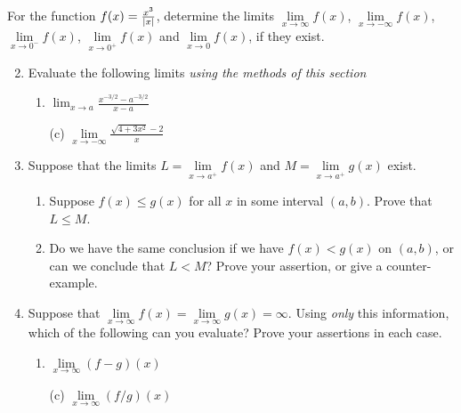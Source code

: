 \begin{exercises}
\exstart For the function $f(x)=\frac{x^3}{\left| x\right|}$, determine the limits $\lim\limits_{x\to\infty}f(x)$, $\lim\limits_{x\to-\infty}f(x)$, $\lim\limits_{x\to 0^-}f(x)$, $\lim\limits_{x\to 0^+}f(x)$ and $\lim\limits_{x\to 0}f(x)$, if they exist.
\begin{enumerate}\setcounter{enumi}{1}\itemsep0pt 
  \item Evaluate the following limits \emph{using the methods of this section}
  \begin{enumerate}
    \item {}
    \space$\displaystyle\lim_{x\to a}\frac{x^{-3/2}-a^{-3/2}}{x-a}$
    \item[(c)] 
    \space $\displaystyle\lim\limits_{x\to -\infty}\frac{\sqrt{4+3x^2}-2}{x}$
  \end{enumerate}
  
  
  \item Suppose that the limits $L=\lim\limits_{x\to a^+}f(x)$ and $M=\lim\limits_{x\to a^+}g(x)$ exist.
  \begin{enumerate}
    \item Suppose $f(x)\le g(x)$ for all $x$ in some interval $(a,b)$. Prove that $L\le M$.
    \item Do we have the same conclusion if we have $f(x)<g(x)$ on $(a,b)$, or can we conclude that $L<M$? Prove your assertion, or give a counter-example.
  \end{enumerate}
  
  
  \item Suppose that $\lim\limits_{x\to\infty}f(x)=\lim\limits_{x\to\infty}g(x)=\infty$. Using \emph{only} this information, which of the following can you evaluate? Prove your assertions in each case.
  \begin{enumerate}
    \item {}\space\space $\lim\limits_{x\to\infty}(f-g)(x)$
    \item[(c)] \space\space $\lim\limits_{x\to\infty}(f/g)(x)$
  \end{enumerate}
  

\end{enumerate}
\end{exercises}
